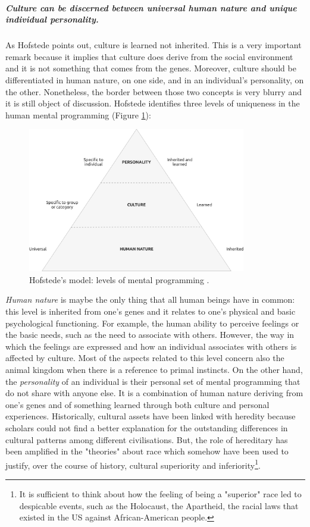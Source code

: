 \documentclass[../main.tex]{subfiles}
\begin{document}
\subparagraph*{Culture can be discerned between universal human nature and unique individual personality.} As Hofstede points out, culture is learned not inherited. This is a very important remark because it implies that culture does derive from the social environment and it is not something that comes from the genes. Moreover, culture should be differentiated in human nature, on one side, and in an individual's personality, on the other. Nonetheless, the border between those two concepts is very blurry and it is still object of discussion. Hofstede identifies three levels of uniqueness in the human mental programming (Figure \ref{hofstede}):
\begin{figure}[h]
    \centering\includegraphics[width=0.85\textwidth]{images/levels-1}
    \caption{Hofstede's model: levels of mental programming \autocite[6]{hofstede}.}
    \label{hofstede}
\end{figure}

\textit{Human nature} is maybe the only thing that all human beings have in common: this level is inherited from one's genes and it relates to one's physical and basic psychological functioning. For example, the human ability to perceive feelings or the basic needs, such as the need to associate with others. However, the way in which the feelings are expressed and how an individual associates with others is affected by culture. Most of the aspects related to this level concern also the animal kingdom when there is a reference to primal instincts. On the other hand, the \textit{personality} of an individual is their personal set of mental programming that do not share with anyone else. It is a combination of human nature deriving from one's genes and of something learned through both culture and personal experiences. Historically, cultural assets have been linked with heredity because scholars could not find a better explanation for the outstanding differences in cultural patterns among different civilisations. But, the role of hereditary has been amplified in the "theories" about race which somehow have been used to justify, over the course of history, cultural superiority and inferiority\footnote{It is sufficient to think about how the feeling of being a "superior" race led to despicable events, such as the Holocaust, the Apartheid, the racial laws that existed in the US against African-American people.}.
\end{document}
